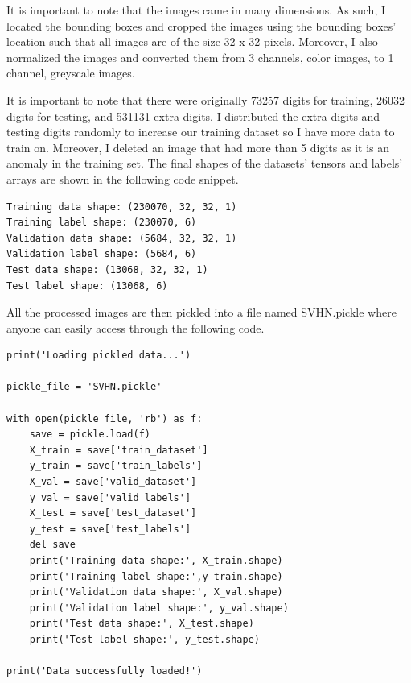 \documentclass[twoside, column]{article}
\begin{document}
It is important to note that the images came in many dimensions. As such, I located the bounding boxes and cropped the images using the bounding boxes' location such that all images are of the size 32 x 32 pixels. Moreover, I also normalized the images and converted them from 3 channels, color images, to 1 channel, greyscale images. 

It is important to note that there were originally 73257 digits for training, 26032 digits for testing, and 531131 extra digits. I distributed the extra digits and testing digits randomly to increase our training dataset so I have more data to train on. Moreover, I deleted an image that had more than 5 digits as it is an anomaly in the training set. The final shapes of the datasets' tensors and labels' arrays are shown in the following code snippet.

\begin{verbatim}
Training data shape: (230070, 32, 32, 1)
Training label shape: (230070, 6)
Validation data shape: (5684, 32, 32, 1)
Validation label shape: (5684, 6)
Test data shape: (13068, 32, 32, 1)
Test label shape: (13068, 6)
 \end{verbatim}
 
 All the processed images are then pickled into a file named SVHN.pickle where anyone can easily access through the following code. 
 
\begin{verbatim}
print('Loading pickled data...')

pickle_file = 'SVHN.pickle'

with open(pickle_file, 'rb') as f:
    save = pickle.load(f)
    X_train = save['train_dataset']
    y_train = save['train_labels']
    X_val = save['valid_dataset']
    y_val = save['valid_labels']
    X_test = save['test_dataset']
    y_test = save['test_labels']
    del save  
    print('Training data shape:', X_train.shape)
    print('Training label shape:',y_train.shape)
    print('Validation data shape:', X_val.shape)
    print('Validation label shape:', y_val.shape)
    print('Test data shape:', X_test.shape)
    print('Test label shape:', y_test.shape)
    
print('Data successfully loaded!')
 \end{verbatim}
 
\end{document}
